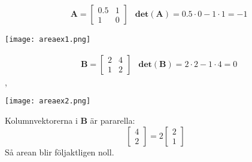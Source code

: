 \begin{Ex}
    \begin{align*}
    &\mathbf{A} = \begin{bmatrix} 0.5&1\\1&0 \end{bmatrix} &\mathbf{det}(\mathbf{A}) = 0.5 \cdot 0 - 1 \cdot 1 = -1
    \end{align*}
    \begin{center}
        \texttt{[image: areaex1.png]}
    \end{center}
\end{Ex}

\begin{Ex}
    \begin{align*}
    &\mathbf{B} = \begin{bmatrix} 2&4\\1&2 \end{bmatrix} & \mathbf{det}(\mathbf{B}) = 2 \cdot 2 - 1 \cdot 4 = 0
    \end{align*},
    \begin{center}
        \texttt{[image: areaex2.png]}
    \end{center}
    Kolumnvektorerna i \textbf{B} är pararella:
    \[
        \begin{bmatrix} 4\\2 \end{bmatrix} = 2 \begin{bmatrix} 2\\1 \end{bmatrix}
    \]
    Så arean blir följaktligen noll.
\end{Ex}
